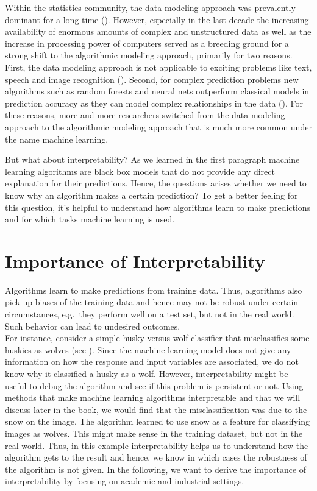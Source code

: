 \documentclass[]{krantz}
\begin{document}
Within the statistics community, the data modeling approach was
prevalently dominant for a long time (\citet{breiman2001}). However,
especially in the last decade the increasing availability of enormous
amounts of complex and unstructured data as well as the increase in
processing power of computers served as a breeding ground for a strong
shift to the algorithmic modeling approach, primarily for two reasons.\\
First, the data modeling approach is not applicable to exciting problems
like text, speech and image recognition (\citet{breiman2001}). Second,
for complex prediction problems new algorithms such as random forests
and neural nets outperform classical models in prediction accuracy as
they can model complex relationships in the data (\citet{breiman2001}).
For these reasons, more and more researchers switched from the data
modeling approach to the algorithmic modeling approach that is much more
common under the name machine learning.

But what about interpretability? As we learned in the first paragraph
machine learning algorithms are black box models that do not provide any
direct explanation for their predictions. Hence, the questions arises
whether we need to know why an algorithm makes a certain prediction? To
get a better feeling for this question, it's helpful to understand how
algorithms learn to make predictions and for which tasks machine
learning is used.

\section{Importance of
Interpretability}\label{importance-of-interpretability}

Algorithms learn to make predictions from training data. Thus,
algorithms also pick up biases of the training data and hence may not be
robust under certain circumstances, e.g.~they perform well on a test
set, but not in the real world. Such behavior can lead to undesired
outcomes.\\
For instance, consider a simple husky versus wolf classifier that
misclassifies some huskies as wolves (see \citet{ribeiro2016should}).
Since the machine learning model does not give any information on how
the response and input variables are associated, we do not know why it
classified a husky as a wolf. However, interpretability might be useful
to debug the algorithm and see if this problem is persistent or not.
Using methods that make machine learning algorithms interpretable and
that we will discuss later in the book, we would find that the
misclassification was due to the snow on the image. The algorithm
learned to use snow as a feature for classifying images as wolves. This
might make sense in the training dataset, but not in the real world.
Thus, in this example interpretability helps us to understand how the
algorithm gets to the result and hence, we know in which cases the
robustness of the algorithm is not given. In the following, we want to
derive the importance of interpretability by focusing on academic and
industrial settings.
\end{document}
